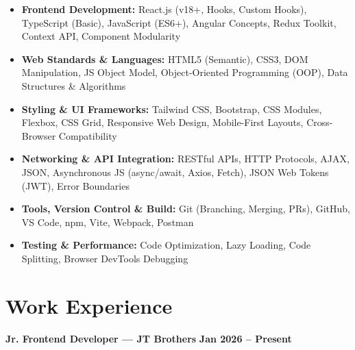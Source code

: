 \documentclass[a4paper,10pt]{article}
\begin{document}
\begin{itemize}

    \item \textbf{Frontend Development:}
    React.js (v18+, Hooks, Custom Hooks), TypeScript (Basic), JavaScript (ES6+),
    Angular Concepts, Redux Toolkit, Context API, Component Modularity

    \item \textbf{Web Standards \& Languages:}
    HTML5 (Semantic), CSS3, DOM Manipulation, JS Object Model,
    Object-Oriented Programming (OOP), Data Structures \& Algorithms

    \item \textbf{Styling \& UI Frameworks:}
    Tailwind CSS, Bootstrap, CSS Modules, Flexbox, CSS Grid,
    Responsive Web Design, Mobile-First Layouts, Cross-Browser Compatibility

    \item \textbf{Networking \& API Integration:}
    RESTful APIs, HTTP Protocols, AJAX, JSON, Asynchronous JS (async/await, Axios, Fetch),
    JSON Web Tokens (JWT), Error Boundaries

    \item \textbf{Tools, Version Control \& Build:}
    Git (Branching, Merging, PRs), GitHub, VS Code, npm, Vite, Webpack, Postman

    \item \textbf{Testing \& Performance:}
    Code Optimization, Lazy Loading, Code Splitting, Browser DevTools Debugging

\end{itemize}

\section*{Work Experience}

\textbf{Jr. Frontend Developer --- JT Brothers}
\hfill
\textbf{Jan 2026 -- Present}
\end{document}
